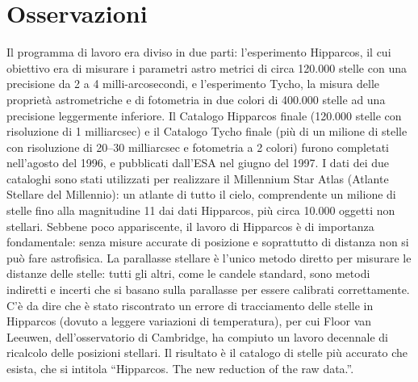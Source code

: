 \documentclass[12pt,a4paper]{article}
\begin{document}
\section*{Osservazioni}
\label{osservazioni}

Il programma di lavoro era diviso in due parti: l'esperimento Hipparcos, il cui obiettivo era di misurare i parametri astro metrici di circa 120.000 stelle con una precisione da 2 a 4 milli-arcosecondi, e l'esperimento Tycho, la misura delle proprietà astrometriche e di fotometria in due colori di 400.000 stelle ad una precisione leggermente inferiore.
Il Catalogo Hipparcos finale (120.000 stelle con risoluzione di 1 milliarcsec) e il Catalogo Tycho finale (più di un milione di stelle con risoluzione di 20--30 milliarcsec e fotometria a 2 colori) furono completati nell'agosto del 1996, e pubblicati dall'ESA nel giugno del 1997.
I dati dei due cataloghi sono stati utilizzati per realizzare il Millennium Star Atlas (Atlante Stellare del Millennio): un atlante di tutto il cielo, comprendente un milione di stelle fino alla magnitudine 11 dai dati Hipparcos, più circa 10.000 oggetti non stellari.
Sebbene poco appariscente, il lavoro di Hipparcos è di importanza fondamentale: senza misure accurate di posizione e soprattutto di distanza non si può fare astrofisica. La parallasse stellare è l'unico metodo diretto per misurare le distanze delle stelle: tutti gli altri, come le candele standard, sono metodi indiretti e incerti che si basano sulla parallasse per essere calibrati correttamente.
C'è da dire che è stato riscontrato un errore di tracciamento delle stelle in Hipparcos (dovuto a leggere variazioni di temperatura), per cui Floor van Leeuwen, dell'osservatorio di Cambridge, ha compiuto un lavoro decennale di ricalcolo delle posizioni stellari. Il risultato è il catalogo di stelle più accurato che esista, che si intitola ``Hipparcos. The new reduction of the raw data.''.
\end{document}
